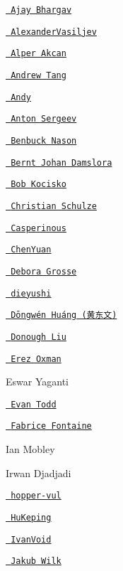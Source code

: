 \begin{DoxyItemize}
\item \href{https://github.com/ajaybhargav}{\texttt{ Ajay Bhargav}}
\item \href{https://github.com/AlexanderVasiljev}{\texttt{ Alexander\+Vasiljev}}
\item \href{https://github.com/alperakcan}{\texttt{ Alper Akcan}}
\item \href{https://github.com/singku}{\texttt{ Andrew Tang}}
\item \href{https://github.com/mlh0101}{\texttt{ Andy}}
\item \href{https://github.com/anton-sergeev}{\texttt{ Anton Sergeev}}
\item \href{https://github.com/bnason-nf}{\texttt{ Benbuck Nason}}
\item \href{https://github.com/bjda}{\texttt{ Bernt Johan Damslora}}
\item \href{https://github.com/bobkocisko}{\texttt{ Bob Kocisko}}
\item \href{https://github.com/ChristianSch}{\texttt{ Christian Schulze}}
\item \href{https://github.com/Casperinous}{\texttt{ Casperinous}}
\item \href{https://github.com/zjuchenyuan}{\texttt{ Chen\+Yuan}}
\item \href{https://github.com/DeboraG}{\texttt{ Debora Grosse}}
\item \href{https://github.com/dieyushi}{\texttt{ dieyushi}}
\item \href{https://github.com/DongwenHuang}{\texttt{ Dōngwén Huáng (黄东文)}}
\item \href{https://github.com/ldm0}{\texttt{ Donough Liu}}
\item \href{https://github.com/erez-o}{\texttt{ Erez Oxman}}
\item Eswar Yaganti
\item \href{https://github.com/etodd}{\texttt{ Evan Todd}}
\item \href{https://github.com/ffontaine}{\texttt{ Fabrice Fontaine}}
\item Ian Mobley
\item Irwan Djadjadi
\item \href{https://github.com/hopper-vul}{\texttt{ hopper-\/vul}}
\item \href{https://github.com/HuKeping}{\texttt{ Hu\+Keping}}
\item \href{https://github.com/npi3pak}{\texttt{ Ivan\+Void}}
\item \href{https://github.com/jwilk}{\texttt{ Jakub Wilk}}

\end{DoxyItemize}
